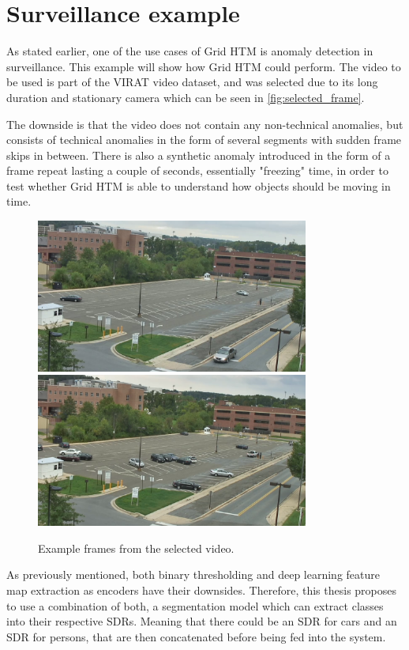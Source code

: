 \section{Surveillance example}
As stated earlier, one of the use cases of Grid HTM is anomaly detection in surveillance. This example will show how Grid HTM could perform.
The video to be used is part of the VIRAT\cite{VIRAT} video dataset, and was selected due to its long duration and stationary camera which can be seen in \autoref{fig:selected_frame}.
\par
The downside is that the video does not contain any non-technical anomalies, but consists of technical anomalies in the form of several segments with sudden frame skips in between. There is also a synthetic anomaly introduced in the form of a frame repeat lasting a couple of seconds, essentially "freezing" time, in order to test whether Grid HTM is able to understand how objects should be moving in time.
\begin{figure}[H]
    \centering
    \includegraphics[width=0.8\textwidth]{resources/methodology/original.png}
    \includegraphics[width=0.8\textwidth]{resources/experiments/surveillance/parking_frame.png}
    \caption{Example frames from the selected video.}
    \label{fig:selected_frame}
\end{figure}
As previously mentioned, both binary thresholding and deep learning feature map extraction as encoders have their downsides. Therefore, this thesis proposes to use a combination of both, a segmentation model which can extract classes into their respective SDRs. Meaning that there could be an SDR for cars and an SDR for persons, that are then concatenated before being fed into the system.
